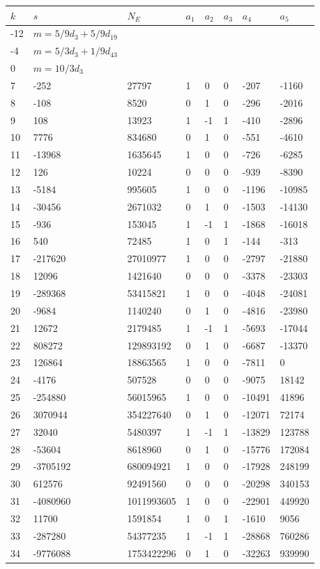 \documentclass{amsart}
\begin{document}
\begin{longtable}{|l|l|l|lllll|}
\hline
$k$ & $s$ & $N_E$ & $a_1$ & $a_2$ & $a_3$ & $a_4$ & $a_5$\\
\hline
-12&$m=5/9d_{3}+5/9d_{19}$&&\multicolumn{5}{c|}{}\\
-4&$m=5/3d_{3}+1/9d_{43}$&&\multicolumn{5}{c|}{}\\
0&$m=10/3d_{3}$&&\multicolumn{5}{c|}{}\\
7&-252&27797&1&0&0&-207&-1160\\
8&-108&8520&0&1&0&-296&-2016\\
9&108&13923&1&-1&1&-410&-2896\\
10&7776&834680&0&1&0&-551&-4610\\
11&-13968&1635645&1&0&0&-726&-6285\\
12&126&10224&0&0&0&-939&-8390\\
13&-5184&995605&1&0&0&-1196&-10985\\
14&-30456&2671032&0&1&0&-1503&-14130\\
15&-936&153045&1&-1&1&-1868&-16018\\
16&540&72485&1&0&1&-144&-313\\
17&-217620&27010977&1&0&0&-2797&-21880\\
18&12096&1421640&0&0&0&-3378&-23303\\
19&-289368&53415821&1&0&0&-4048&-24081\\
20&-9684&1140240&0&1&0&-4816&-23980\\
21&12672&2179485&1&-1&1&-5693&-17044\\
22&808272&129893192&0&1&0&-6687&-13370\\
23&126864&18863565&1&0&0&-7811&0\\
24&-4176&507528&0&0&0&-9075&18142\\
25&-254880&56015965&1&0&0&-10491&41896\\
26&3070944&354227640&0&1&0&-12071&72174\\
27&32040&5480397&1&-1&1&-13829&123788\\
28&-53604&8618960&0&1&0&-15776&172084\\
29&-3705192&680094921&1&0&0&-17928&248199\\
30&612576&92491560&0&0&0&-20298&340153\\
31&-4080960&1011993605&1&0&0&-22901&449920\\
32&11700&1591854&1&0&1&-1610&9056\\
33&-287280&54377235&1&-1&1&-28868&760286\\
34&-9776088&1753422296&0&1&0&-32263&939990\\

\end{longtable}
\end{document}
